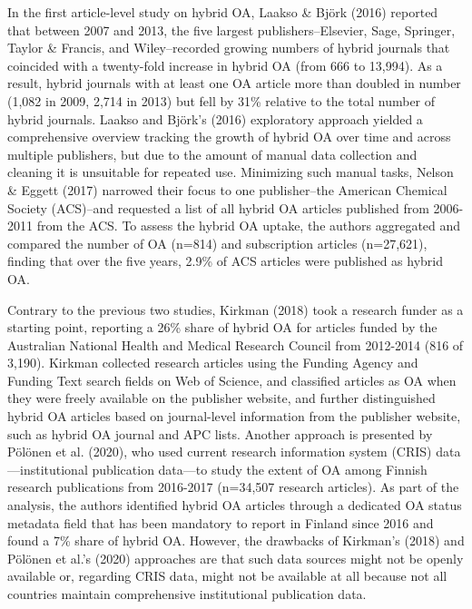 \documentclass[a4paper,man,floatsintext,longtable,noextraspace,12pt]{apa6}
\begin{document}
In the first article-level study on hybrid OA, Laakso \& Björk (2016)
reported that between 2007 and 2013, the five largest
publishers--Elsevier, Sage, Springer, Taylor \& Francis, and
Wiley--recorded growing numbers of hybrid journals that coincided with a
twenty-fold increase in hybrid OA (from 666 to 13,994). As a result,
hybrid journals with at least one OA article more than doubled in number
(1,082 in 2009, 2,714 in 2013) but fell by 31\% relative to the total
number of hybrid journals. Laakso and Björk's (2016) exploratory
approach yielded a comprehensive overview tracking the growth of hybrid
OA over time and across multiple publishers, but due to the amount of
manual data collection and cleaning it is unsuitable for repeated use.
Minimizing such manual tasks, Nelson \& Eggett (2017) narrowed their
focus to one publisher--the American Chemical Society (ACS)--and
requested a list of all hybrid OA articles published from 2006-2011 from
the ACS. To assess the hybrid OA uptake, the authors aggregated and
compared the number of OA (n=814) and subscription articles (n=27,621),
finding that over the five years, 2.9\% of ACS articles were published
as hybrid OA.

Contrary to the previous two studies, Kirkman (2018) took a research
funder as a starting point, reporting a 26\% share of hybrid OA for
articles funded by the Australian National Health and Medical Research
Council from 2012-2014 (816 of 3,190). Kirkman collected research
articles using the Funding Agency and Funding Text search fields on Web
of Science, and classified articles as OA when they were freely
available on the publisher website, and further distinguished hybrid OA
articles based on journal-level information from the publisher website,
such as hybrid OA journal and APC lists. Another approach is presented
by Pölönen et al. (2020), who used current research information system
(CRIS) data---institutional publication data---to study the extent of OA
among Finnish research publications from 2016-2017 (n=34,507 research
articles). As part of the analysis, the authors identified hybrid OA
articles through a dedicated OA status metadata field that has been
mandatory to report in Finland since 2016 and found a 7\% share of
hybrid OA. However, the drawbacks of Kirkman's (2018) and Pölönen et
al.'s (2020) approaches are that such data sources might not be openly
available or, regarding CRIS data, might not be available at all because
not all countries maintain comprehensive institutional publication data.
\end{document}
